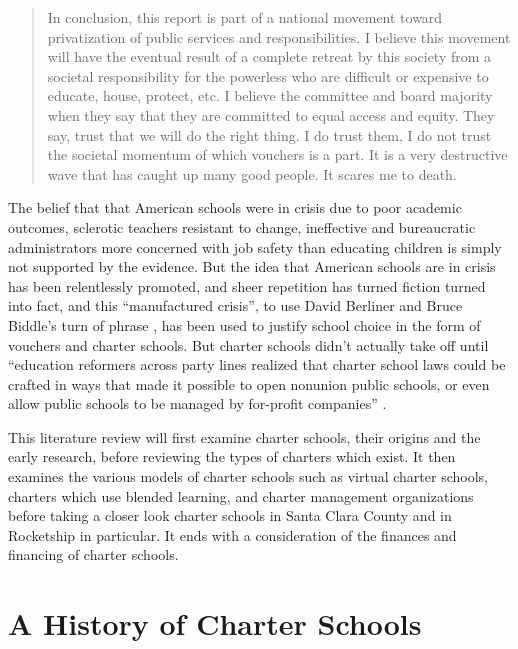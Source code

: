 \begin{quote}\OnehalfSpacing%
In conclusion, this report is part of a national movement toward privatization of public services and responsibilities.
I believe this movement will have the eventual result of a complete retreat by this society from a societal responsibility for the powerless who are difficult or expensive to educate, house, protect, etc. I believe the committee and board majority when they say that they are committed to equal access and equity. They say, trust that we will do the right thing. I do trust them, I do not trust the societal momentum of which vouchers is a part. It is a very destructive wave that has caught up many good people. It scares me to death. 
\end{quote}

The belief that that American schools were in crisis due to poor academic outcomes, sclerotic teachers resistant to change, ineffective and bureaucratic administrators more concerned with job safety than educating children is simply not supported by the evidence. But the idea that American schools are in crisis has been relentlessly promoted, and sheer repetition has turned fiction turned into fact, and this ``manufactured crisis'', to use David Berliner and Bruce Biddle's turn of phrase \parencite{Berliner.Biddle1997}, has been used to justify school choice in the form of vouchers and charter schools. But charter schools didn't actually take off until ``education reformers across party lines realized that charter school laws could be crafted in ways that made it possible to open nonunion public schools, or even allow public schools to be managed by for-profit companies'' \parencite[172]{Goldstein2015a}.

This literature review will first examine charter schools, their origins and the early research, before reviewing the types of charters which exist. It then examines the various models of charter schools such as virtual charter schools, charters which use blended learning, and charter management organizations before taking a closer look charter schools in Santa Clara County and in Rocketship in particular. It ends with a consideration of the finances and financing of charter schools.

\section{A History of Charter Schools}\label{sec:cs-history}\indent

